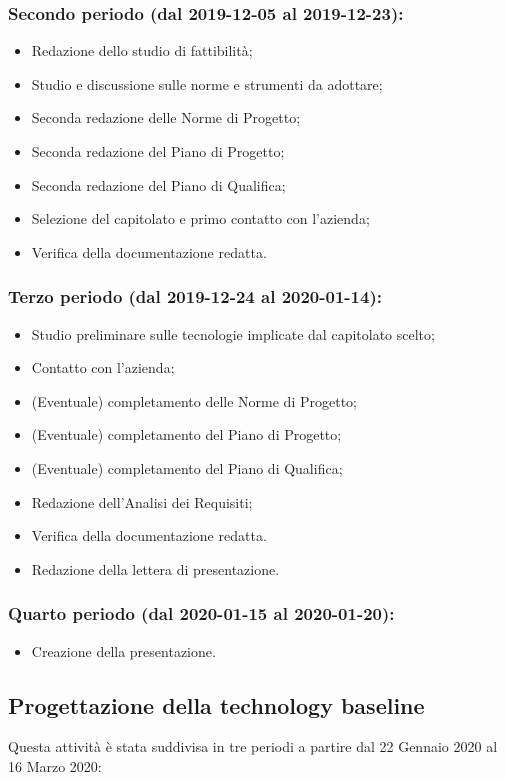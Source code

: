 		\subsubsection{Secondo periodo (dal 2019-12-05 al 2019-12-23):}
		\begin{itemize}
			\item Redazione dello studio di fattibilità;
			\item Studio e discussione sulle norme e strumenti da adottare;
			\item Seconda redazione delle Norme di Progetto;
			\item Seconda redazione del Piano di Progetto;
			\item Seconda redazione del Piano di Qualifica;
			\item Selezione del capitolato e primo contatto con l'azienda;
			\item Verifica della documentazione redatta.
		\end{itemize}
		\subsubsection{Terzo periodo (dal 2019-12-24 al 2020-01-14):}
		\begin{itemize}
			\item Studio preliminare sulle tecnologie implicate dal capitolato scelto;
			\item Contatto con l'azienda;
			\item (Eventuale) completamento delle Norme di Progetto;
			\item (Eventuale) completamento del Piano di Progetto;
			\item (Eventuale) completamento del Piano di Qualifica;
			\item Redazione dell'Analisi dei Requisiti;
			\item Verifica della documentazione redatta.
			\item Redazione della lettera di presentazione.
		\end{itemize}
		\subsubsection{Quarto periodo (dal 2020-01-15 al 2020-01-20):}
		\begin{itemize}
			\item Creazione della presentazione. 
		\end{itemize}

	\subsection{Progettazione della technology baseline}
	Questa attività è stata suddivisa in tre periodi a partire dal 22 Gennaio 2020 al 16 Marzo 2020:


